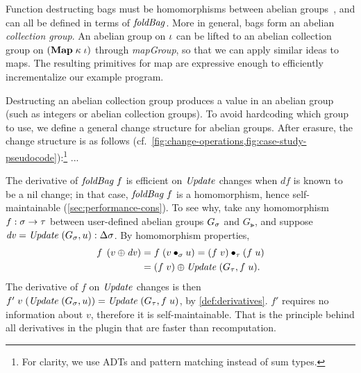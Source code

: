 \begin{oldSec}
Function destructing bags must be homomorphisms between abelian
groups~\citep{GlucheGrust97Incr}, and can all be defined in terms
of $\mathit{foldBag}$. More in general, bags form an abelian
\emph{collection group}.
%
%
An abelian group on $\iota$ can be lifted to an abelian collection
group on $(\HashMap{\kappa}{\Gi})$ through \emph{mapGroup}, so that we
can apply similar ideas to maps. The resulting primitives for map
are expressive enough to efficiently incrementalize our example
program.

Destructing an abelian collection group produces a value in an
abelian group (such as integers or abelian collection groups). To
avoid hardcoding which group to use, we define a general change
structure for abelian groups. After erasure, the change structure is as follows
(cf.~\cref{fig:change-operations,fig:case-study-pseudocode}):\footnote{For clarity, we use ADTs and pattern matching instead of sum types.}
...

The derivative of $\App{\FOLDBAG}{f}$ is efficient on $\mathit{Update}$ changes when $df$ is
known to be a nil change; in that case,
$\App{\FOLDBAG}{f}$ is a homomorphism, hence self-maintainable (\cref{sec:performance-cons}). To see why, take any homomorphism $\HasType f {\Fun \Gs \Gt}$
between user-defined
abelian groups $G_\sigma$ and $G_\Gt$, and suppose
$\D v = \HasType{\Term{Update} \; (G_\Gs, u)}{\Change \Gs}$. By homomorphism properties,
\begin{align*}
\App f {\Update*{v}{\D v}}
&= \App f {(v \bullet_\Gs u)}
= \App* f v  \bullet_\Gt \App* f u \\
&= \Update{\App* f v}{\Term{Update} \;(G_\Gt, \App f u)}.
\end{align*}
The derivative of $f$ on
$\mathit{Update}$ changes is then $\App{\App{f'}{v}}{(\Term{Update} \; (G_\Gs, u))} = \Term{Update} \; (G_\Gt, \App f u)$,
by \cref{def:derivatives}.
$f'$
requires no information about $v$, therefore it is
self-maintainable. That is the
principle behind all derivatives in the plugin that are faster
than recomputation.
\end{oldSec}

